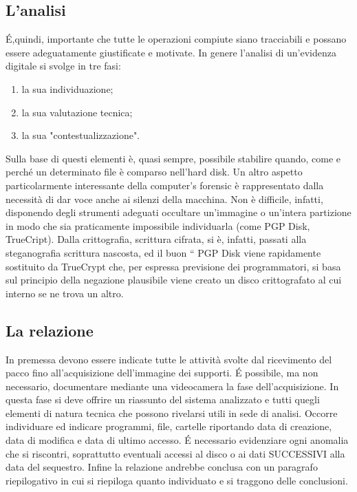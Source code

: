 \subsection{ L'analisi}
\'E,quindi, importante che tutte le operazioni compiute siano tracciabili e possano essere adeguatamente giustificate e motivate. In genere l'analisi di un'evidenza digitale si svolge in tre fasi:
\begin{enumerate}
    \item la sua individuazione;
    \item la sua valutazione tecnica;
    \item la sua "contestualizzazione".
\end{enumerate}
Sulla base di questi elementi è, quasi sempre, possibile stabilire quando, come e perché un determinato file è comparso nell'hard disk. Un altro aspetto particolarmente interessante della computer's forensic è rappresentato dalla necessità di dar voce anche ai silenzi della macchina. Non è difficile, infatti, disponendo degli strumenti adeguati occultare un'immagine o un'intera partizione in modo che sia praticamente impossibile individuarla (come PGP Disk, TrueCript).  Dalla crittografia, scrittura cifrata, si è, infatti, passati alla steganografia scrittura
nascosta, ed il buon “ PGP Disk viene rapidamente sostituito da TrueCrypt che, per espressa previsione dei
programmatori, si basa sul principio della negazione plausibile viene creato un disco crittografato al cui interno se ne trova un altro.
\subsection{La relazione}
In premessa devono essere indicate tutte le attività svolte dal ricevimento del pacco fino all'acquisizione dell'immagine dei supporti. \'E possibile, ma non necessario, documentare mediante una videocamera la fase dell'acquisizione. In questa fase si deve offrire un riassunto del sistema analizzato e tutti quegli elementi di natura tecnica che possono rivelarsi utili in sede di analisi. Occorre individuare ed indicare programmi, file, cartelle riportando data di creazione, data di modifica e data di ultimo accesso. \'E necessario evidenziare ogni anomalia che si riscontri, soprattutto eventuali accessi al disco o ai dati SUCCESSIVI alla data del sequestro. Infine la relazione andrebbe conclusa con un paragrafo riepilogativo in cui si riepiloga quanto individuato e si traggono delle conclusioni.

